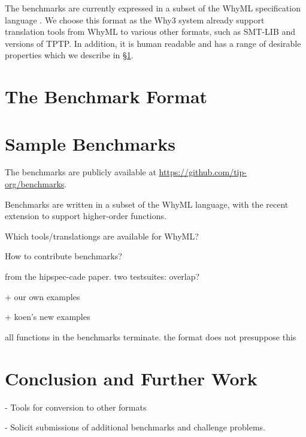 \documentclass{llncs}
\begin{document}
The benchmarks are currently expressed in a subset of the WhyML specification language \cite{whyML}. We choose this format as the Why3 system already support translation tools from WhyML to various other formats, such as SMT-LIB and versions of TPTP. In addition, it is human readable and has a range of desirable properties which we describe in \S \ref{sec:format}. 

\section{The Benchmark Format}
\label{sec:format}

\section{Sample Benchmarks}

The benchmarks are publicly available at \url{https://github.com/tip-org/benchmarks}. 

Benchmarks are written in a subset of the WhyML language, with the recent extension to support higher-order functions.

Which tools/translationgs are available for WhyML?

How to contribute benchmarks?

from the hipspec-cade paper. two testsuites: overlap?

+ our own examples

+ koen's new examples

all functions in the benchmarks terminate. the format does not presuppose this

%
%
%
%

\section{Conclusion and Further Work}
- Tools for conversion to other formats

- Solicit submissions of additional benchmarks and challenge problems.



\end{document}
